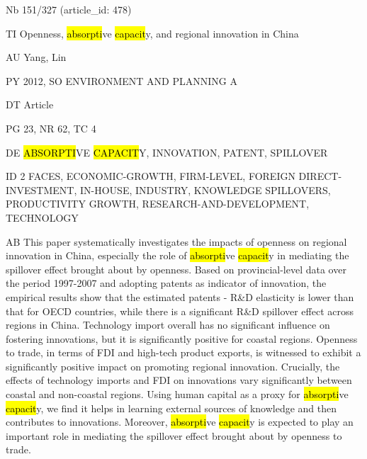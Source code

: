 \documentclass[a4paper]{article}
\begin{document}
\vspace*{-2cm}
Nb \tabto{0cm}151/327 (article\_id: 478)\par
TI \tabto{0cm}Openness, \hl{absorpti}ve \hl{capacit}y, and regional innovation in China\par
AU \tabto{0cm}Yang, Lin\par
PY \tabto{0cm}2012, SO ENVIRONMENT AND PLANNING A\par
DT \tabto{0cm}Article\par
PG \tabto{0cm}23, NR 62, TC 4\par
DE \tabto{0cm}\hl{ABSORPTI}VE \hl{CAPACIT}Y, INNOVATION, PATENT, SPILLOVER\par
ID \tabto{0cm}2 FACES, ECONOMIC-GROWTH, FIRM-LEVEL, FOREIGN DIRECT-INVESTMENT, IN-HOUSE, INDUSTRY, KNOWLEDGE SPILLOVERS, PRODUCTIVITY GROWTH, RESEARCH-AND-DEVELOPMENT, TECHNOLOGY\par
AB \tabto{0cm}This paper systematically investigates the impacts of openness on regional innovation in China, especially the role of \hl{absorpti}ve \hl{capacit}y in mediating the spillover effect brought about by openness. Based on provincial-level data over the period 1997-2007 and adopting patents as indicator of innovation, the empirical results show that the estimated patents - R\&D elasticity is lower than that for OECD countries, while there is a significant R\&D spillover effect across regions in China. Technology import overall has no significant influence on fostering innovations, but it is significantly positive for coastal regions. Openness to trade, in terms of FDI and high-tech product exports, is witnessed to exhibit a significantly positive impact on promoting regional innovation. Crucially, the effects of technology imports and FDI on innovations vary significantly between coastal and non-coastal regions. Using human capital as a proxy for \hl{absorpti}ve \hl{capacit}y, we find it helps in learning external sources of knowledge and then contributes to innovations. Moreover, \hl{absorpti}ve \hl{capacit}y is expected to play an important role in mediating the spillover effect brought about by openness to trade.\par
\clearpage
\end{document}
